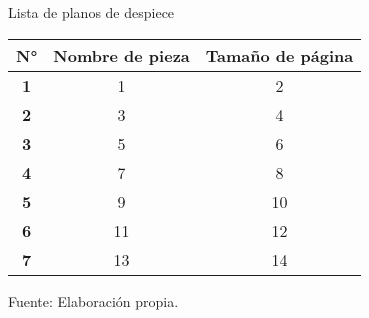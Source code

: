 \begin{mytable}[H]
	\centering
	\caption{Lista de planos de despiece}
	\label{tab:plano de despiece}
	\begin{tabular}{|c|c|c|}
		\hline
		\textbf{N°} & \textbf{Nombre de pieza} & \textbf{Tamaño de página} \\ \hline
		\textbf{1}  & 1                        & 2                         \\ \hline
		\textbf{2}  & 3                        & 4                         \\ \hline
		\textbf{3}  & 5                        & 6                         \\ \hline
		\textbf{4}  & 7                        & 8                         \\ \hline
		\textbf{5}  & 9                        & 10                        \\ \hline
		\textbf{6}  & 11                       & 12                        \\ \hline
		\textbf{7}  & 13                       & 14                        \\ \hline
	\end{tabular}
	\begin{flushleft}	
	Fuente: Elaboración propia.
\end{flushleft}
\end{mytable}
